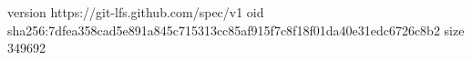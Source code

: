 version https://git-lfs.github.com/spec/v1
oid sha256:7dfea358cad5e891a845c715313cc85af915f7c8f18f01da40e31edc6726c8b2
size 349692

